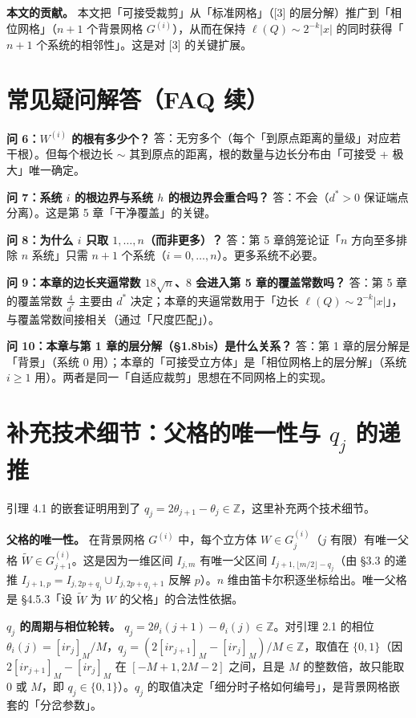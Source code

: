 \documentclass[a4paper,11pt,openany]{ctexbook}
\numberwithin{equation}{chapter}
\numberwithin{figure}{chapter}
\numberwithin{table}{chapter}
\begin{document}
\textbf{本文的贡献。} 本文把「可接受裁剪」从「标准网格」（[3] 的层分解）推广到「相位网格」（$n+1$ 个背景网格 $G^{(i)}$），从而在保持 $\ell(Q)\sim2^{-k}|x|$ 的同时获得「$n+1$ 个系统的相邻性」。这是对 [3] 的关键扩展。

\section{常见疑问解答（FAQ 续）}

\textbf{问 6：$W^{(i)}$ 的根有多少个？} 答：无穷多个（每个「到原点距离的量级」对应若干根）。但每个根边长 $\sim$ 其到原点的距离，根的数量与边长分布由「可接受 + 极大」唯一确定。

\textbf{问 7：系统 $i$ 的根边界与系统 $h$ 的根边界会重合吗？} 答：不会（$d^*>0$ 保证端点分离）。这是第 5 章「干净覆盖」的关键。

\textbf{问 8：为什么 $i$ 只取 $1,\dots,n$（而非更多）？} 答：第 5 章鸽笼论证「$n$ 方向至多排除 $n$ 系统」只需 $n+1$ 个系统（$i=0,\dots,n$）。更多系统不必要。

\textbf{问 9：本章的边长夹逼常数 $18\sqrt n$、$8$ 会进入第 5 章的覆盖常数吗？} 答：第 5 章的覆盖常数 $\frac4{d^*}$ 主要由 $d^*$ 决定；本章的夹逼常数用于「边长 $\ell(Q)\sim2^{-k}|x|$」，与覆盖常数间接相关（通过「尺度匹配」）。

\textbf{问 10：本章与第 1 章的层分解（§1.8bis）是什么关系？} 答：第 1 章的层分解是「背景」（系统 0 用）；本章的「可接受立方体」是「相位网格上的层分解」（系统 $i\ge1$ 用）。两者是同一「自适应裁剪」思想在不同网格上的实现。

\section{补充技术细节：父格的唯一性与 $q_j$ 的递推}

引理 4.1 的嵌套证明用到了 $q_j=2\theta_{j+1}-\theta_j\in\mathbb Z$，这里补充两个技术细节。

\textbf{父格的唯一性。} 在背景网格 $G^{(i)}$ 中，每个立方体 $W\in G_j^{(i)}$（$j$ 有限）有唯一父格 $\widetilde W\in G_{j+1}^{(i)}$。这是因为一维区间 $I_{j,m}$ 有唯一父区间 $I_{j+1,\lfloor m/2\rfloor-q_j}$（由 §3.3 的递推 $I_{j+1,p}=I_{j,2p+q_j}\cup I_{j,2p+q_j+1}$ 反解 $p$）。$n$ 维由笛卡尔积逐坐标给出。唯一父格是 §4.5.3「设 $\widetilde W$ 为 $W$ 的父格」的合法性依据。

\textbf{$q_j$ 的周期与相位轮转。} $q_j=2\theta_i(j+1)-\theta_i(j)\in\mathbb Z$。对引理 2.1 的相位 $\theta_i(j)=[ir_j]_M/M$，$q_j=(2[ir_{j+1}]_M-[ir_j]_M)/M\in\mathbb Z$，取值在 $\{0,1\}$（因 $2[ir_{j+1}]_M-[ir_j]_M$ 在 $[-M+1,2M-2]$ 之间，且是 $M$ 的整数倍，故只能取 $0$ 或 $M$，即 $q_j\in\{0,1\}$）。$q_j$ 的取值决定「细分时子格如何编号」，是背景网格嵌套的「分岔参数」。
\end{document}
